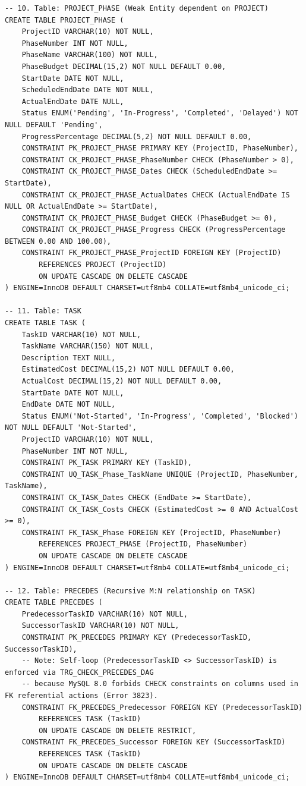 \documentclass[a4paper,12pt]{report}
\begin{document}
\begin{lstlisting}
-- 10. Table: PROJECT_PHASE (Weak Entity dependent on PROJECT)
CREATE TABLE PROJECT_PHASE (
    ProjectID VARCHAR(10) NOT NULL,
    PhaseNumber INT NOT NULL,
    PhaseName VARCHAR(100) NOT NULL,
    PhaseBudget DECIMAL(15,2) NOT NULL DEFAULT 0.00,
    StartDate DATE NOT NULL,
    ScheduledEndDate DATE NOT NULL,
    ActualEndDate DATE NULL,
    Status ENUM('Pending', 'In-Progress', 'Completed', 'Delayed') NOT NULL DEFAULT 'Pending',
    ProgressPercentage DECIMAL(5,2) NOT NULL DEFAULT 0.00,
    CONSTRAINT PK_PROJECT_PHASE PRIMARY KEY (ProjectID, PhaseNumber),
    CONSTRAINT CK_PROJECT_PHASE_PhaseNumber CHECK (PhaseNumber > 0),
    CONSTRAINT CK_PROJECT_PHASE_Dates CHECK (ScheduledEndDate >= StartDate),
    CONSTRAINT CK_PROJECT_PHASE_ActualDates CHECK (ActualEndDate IS NULL OR ActualEndDate >= StartDate),
    CONSTRAINT CK_PROJECT_PHASE_Budget CHECK (PhaseBudget >= 0),
    CONSTRAINT CK_PROJECT_PHASE_Progress CHECK (ProgressPercentage BETWEEN 0.00 AND 100.00),
    CONSTRAINT FK_PROJECT_PHASE_ProjectID FOREIGN KEY (ProjectID)
        REFERENCES PROJECT (ProjectID)
        ON UPDATE CASCADE ON DELETE CASCADE
) ENGINE=InnoDB DEFAULT CHARSET=utf8mb4 COLLATE=utf8mb4_unicode_ci;

-- 11. Table: TASK
CREATE TABLE TASK (
    TaskID VARCHAR(10) NOT NULL,
    TaskName VARCHAR(150) NOT NULL,
    Description TEXT NULL,
    EstimatedCost DECIMAL(15,2) NOT NULL DEFAULT 0.00,
    ActualCost DECIMAL(15,2) NOT NULL DEFAULT 0.00,
    StartDate DATE NOT NULL,
    EndDate DATE NOT NULL,
    Status ENUM('Not-Started', 'In-Progress', 'Completed', 'Blocked') NOT NULL DEFAULT 'Not-Started',
    ProjectID VARCHAR(10) NOT NULL,
    PhaseNumber INT NOT NULL,
    CONSTRAINT PK_TASK PRIMARY KEY (TaskID),
    CONSTRAINT UQ_TASK_Phase_TaskName UNIQUE (ProjectID, PhaseNumber, TaskName),
    CONSTRAINT CK_TASK_Dates CHECK (EndDate >= StartDate),
    CONSTRAINT CK_TASK_Costs CHECK (EstimatedCost >= 0 AND ActualCost >= 0),
    CONSTRAINT FK_TASK_Phase FOREIGN KEY (ProjectID, PhaseNumber)
        REFERENCES PROJECT_PHASE (ProjectID, PhaseNumber)
        ON UPDATE CASCADE ON DELETE CASCADE
) ENGINE=InnoDB DEFAULT CHARSET=utf8mb4 COLLATE=utf8mb4_unicode_ci;

-- 12. Table: PRECEDES (Recursive M:N relationship on TASK)
CREATE TABLE PRECEDES (
    PredecessorTaskID VARCHAR(10) NOT NULL,
    SuccessorTaskID VARCHAR(10) NOT NULL,
    CONSTRAINT PK_PRECEDES PRIMARY KEY (PredecessorTaskID, SuccessorTaskID),
    -- Note: Self-loop (PredecessorTaskID <> SuccessorTaskID) is enforced via TRG_CHECK_PRECEDES_DAG
    -- because MySQL 8.0 forbids CHECK constraints on columns used in FK referential actions (Error 3823).
    CONSTRAINT FK_PRECEDES_Predecessor FOREIGN KEY (PredecessorTaskID)
        REFERENCES TASK (TaskID)
        ON UPDATE CASCADE ON DELETE RESTRICT,
    CONSTRAINT FK_PRECEDES_Successor FOREIGN KEY (SuccessorTaskID)
        REFERENCES TASK (TaskID)
        ON UPDATE CASCADE ON DELETE CASCADE
) ENGINE=InnoDB DEFAULT CHARSET=utf8mb4 COLLATE=utf8mb4_unicode_ci;


\end{lstlisting}
\end{document}
